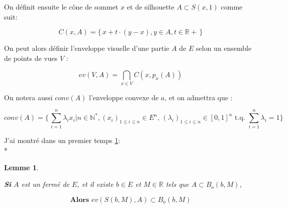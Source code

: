 \documentclass[a4paper]{article}
\newtheorem{lem}{Lemme}
\begin{document}
    On définit ensuite le cône de sommet $x$ et de silhouette $A \subset S(x, 1)$ comme suit:

    \[C(x,A) = \{\,x + t\cdot{}(y - x), y\in{}A, t\in\mathbb{R}+\,\}\]

    On peut alors définir l'enveloppe visuelle d'une partie $A$ de $E$ selon un ensemble de points de vues $V$ :

    \[ev(V, A) = \bigcap_{x\in{}V}C(x,p_{x}(A))\]

    On notera aussi $conv(A)$ l'enveloppe convexe de $a$, et on admettra que :

    \[conv(A) = \{\,\sum_{i=1}^{n} \lambda_{i} x_{i}| n\in{}\mathbb{N}^{*}, (x_{i})_{1\leqslant i \leqslant n} \in E^{n}, \, (\lambda_{i})_{1\leqslant i \leqslant n} \in [0, 1]^{n}\text{ t.q. } \sum_{i=1}^{n} \lambda_{i} = 1\}\]

    J'ai montré dans un premier temps \ref{lem1}:\\*
    \begin{lem}\label{lem1}

    \textbf{Si} $A$ est un fermé de $E$, et il existe $b \in E$ et $M \in \mathbb{R}$ tels que $A \subset B_{o}(b, M)$,

    \[\textbf{Alors } ev(S(b,M), A) \subset B_{o}(b, M)\]

    \end{lem}
\end{document}
